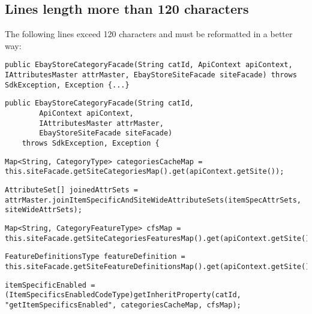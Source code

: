 \subsection{Lines length more than 120 characters}
The following lines exceed 120 characters and must be reformatted in a better way:
\begin{lstlisting}[firstnumber=75, caption={Line 75 violation of the rule}]
public EbayStoreCategoryFacade(String catId, ApiContext apiContext, IAttributesMaster attrMaster, EbayStoreSiteFacade siteFacade) throws SdkException, Exception {...}
\end{lstlisting}
\begin{lstlisting}[firstnumber=75, caption={Line 75 possible solution}]
public EbayStoreCategoryFacade(String catId,
        ApiContext apiContext,
        IAttributesMaster attrMaster,
        EbayStoreSiteFacade siteFacade)
    throws SdkException, Exception {
\end{lstlisting}
\noindent\makebox[\linewidth]{\rule{\linewidth}{0.4pt}}
\begin{lstlisting}[firstnumber=112, caption={Line 112 violation of the rule}]
Map<String, CategoryType> categoriesCacheMap = this.siteFacade.getSiteCategoriesMap().get(apiContext.getSite());
\end{lstlisting}
\noindent\makebox[\linewidth]{\rule{\linewidth}{0.4pt}}
\begin{lstlisting}[firstnumber=95, caption={Line 95 violation of the rule}]
AttributeSet[] joinedAttrSets = attrMaster.joinItemSpecificAndSiteWideAttributeSets(itemSpecAttrSets, siteWideAttrSets);
\end{lstlisting}
\noindent\makebox[\linewidth]{\rule{\linewidth}{0.4pt}}
\begin{lstlisting}[firstnumber=114, caption={Line 114 violation of the rule}]
Map<String, CategoryFeatureType> cfsMap = this.siteFacade.getSiteCategoriesFeaturesMap().get(apiContext.getSite());
\end{lstlisting}
\noindent\makebox[\linewidth]{\rule{\linewidth}{0.4pt}}
\begin{lstlisting}[firstnumber=116, caption={Line 116 violation of the rule}]
FeatureDefinitionsType featureDefinition = this.siteFacade.getSiteFeatureDefinitionsMap().get(apiContext.getSite());
\end{lstlisting}
\noindent\makebox[\linewidth]{\rule{\linewidth}{0.4pt}}
\begin{lstlisting}[firstnumber=119, caption={Line 119 violation of the rule}]
itemSpecificEnabled = (ItemSpecificsEnabledCodeType)getInheritProperty(catId, "getItemSpecificsEnabled", categoriesCacheMap, cfsMap);
\end{lstlisting}
